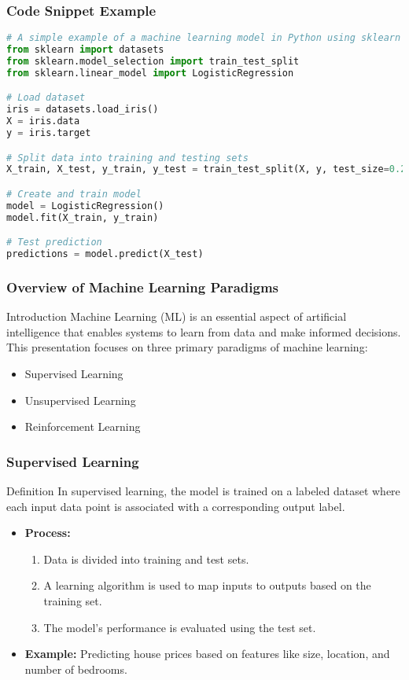 \documentclass[aspectratio=169]{beamer}
\begin{document}
\begin{frame}[fragile]
    \frametitle{Code Snippet Example}
    \begin{lstlisting}[language=Python]
# A simple example of a machine learning model in Python using sklearn
from sklearn import datasets
from sklearn.model_selection import train_test_split
from sklearn.linear_model import LogisticRegression

# Load dataset
iris = datasets.load_iris()
X = iris.data
y = iris.target

# Split data into training and testing sets
X_train, X_test, y_train, y_test = train_test_split(X, y, test_size=0.2, random_state=42)

# Create and train model
model = LogisticRegression()
model.fit(X_train, y_train)

# Test prediction
predictions = model.predict(X_test)
    \end{lstlisting}
\end{frame}

\begin{frame}[fragile]
    \frametitle{Overview of Machine Learning Paradigms}
    \begin{block}{Introduction}
        Machine Learning (ML) is an essential aspect of artificial intelligence that enables systems to learn from data and make informed decisions. This presentation focuses on three primary paradigms of machine learning:
        \begin{itemize}
            \item Supervised Learning
            \item Unsupervised Learning
            \item Reinforcement Learning
        \end{itemize}
    \end{block}
\end{frame}

\begin{frame}[fragile]
    \frametitle{Supervised Learning}
    \begin{block}{Definition}
        In supervised learning, the model is trained on a labeled dataset where each input data point is associated with a corresponding output label.
    \end{block}
    \begin{itemize}
        \item \textbf{Process:}
            \begin{enumerate}
                \item Data is divided into training and test sets.
                \item A learning algorithm is used to map inputs to outputs based on the training set.
                \item The model's performance is evaluated using the test set.
            \end{enumerate}
        \item \textbf{Example:} Predicting house prices based on features like size, location, and number of bedrooms.
    \end{itemize}
\end{frame}
\end{document}
